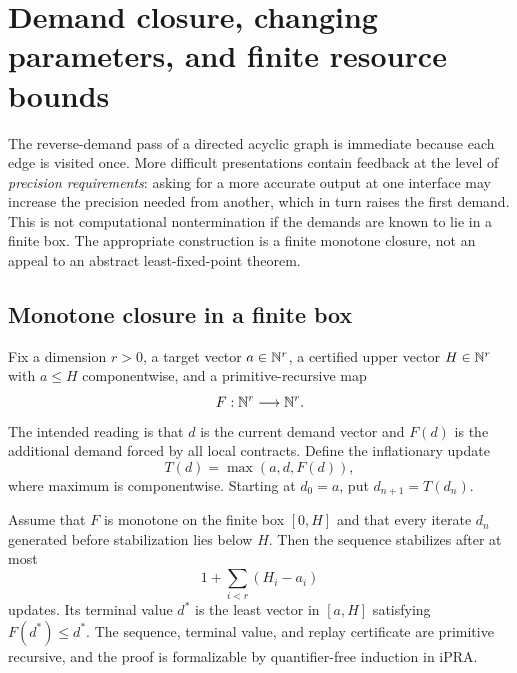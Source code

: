 \section{Demand closure, changing parameters, and finite resource bounds}

The reverse-demand pass of a directed acyclic graph is immediate because each edge is visited once.  More difficult presentations contain feedback at the level of \emph{precision requirements}: asking for a more accurate output at one interface may increase the precision needed from another, which in turn raises the first demand.  This is not computational nontermination if the demands are known to lie in a finite box.  The appropriate construction is a finite monotone closure, not an appeal to an abstract least-fixed-point theorem.

\subsection{Monotone closure in a finite box}

Fix a dimension $r>0$, a target vector $a\in\mathbb N^r$, a certified upper vector $H\in\mathbb N^r$ with $a\leq H$ componentwise, and a primitive-recursive map
\[
  F:\mathbb N^r\longrightarrow\mathbb N^r.
\]
The intended reading is that $d$ is the current demand vector and $F(d)$ is the additional demand forced by all local contracts.  Define the inflationary update
\[
  T(d)=\max(a,d,F(d)),
\]
where maximum is componentwise.  Starting at $d_0=a$, put $d_{n+1}=T(d_n)$.

\begin{theorem}\label{thm:demand-closure}
Assume that $F$ is monotone on the finite box $[0,H]$ and that every iterate $d_n$ generated before stabilization lies below $H$.  Then the sequence stabilizes after at most
\[
  1+\sum_{i<r}(H_i-a_i)
\]
updates.  Its terminal value $d^*$ is the least vector in $[a,H]$ satisfying $F(d^*)\leq d^*$.  The sequence, terminal value, and replay certificate are primitive recursive, and the proof is formalizable by quantifier-free induction in iPRA.
\end{theorem}

